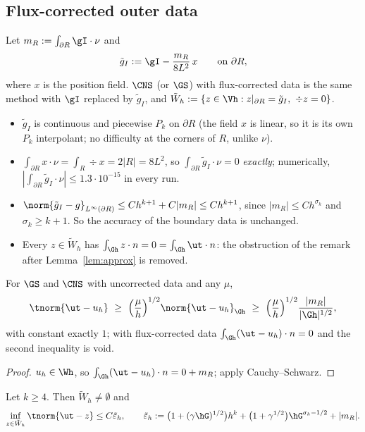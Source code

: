 \subsection{Flux-corrected outer data}\label{rs:sec:flux}

\begin{definition}\label{rs:def}
Let $m_R:=\int_{\partial R}\gI\cdot\nu$ and
\[
\tilde g_I:=\gI-\frac{m_R}{8L^2}\,x\qquad\text{on }\partial R,
\]
where $x$ is the position field. $\CNS$ (or $\GS$) with flux-corrected data is the same method with $\gI$ replaced by $\tilde g_I$, and $\tilde W_h:=\{z\in\Vh:z|_{\partial R}=\tilde g_I,\ \div z=0\}$.
\end{definition}

\begin{itemize}
\item $\tilde g_I$ is continuous and piecewise $P_k$ on $\partial R$ (the field $x$ is linear, so it is its own $P_k$ interpolant; no difficulty at the corners of $R$, unlike $\nu$).
\item $\int_{\partial R}x\cdot\nu=\int_R\div x=2|R|=8L^2$, so $\int_{\partial R}\tilde g_I\cdot\nu=0$ \emph{exactly}; numerically, $|\int_{\partial R}\tilde g_I\cdot\nu|\le1.3\cdot10^{-15}$ in every run.
\item $\norm{\tilde g_I-g}_{L^\infty(\partial R)}\le Ch^{k+1}+C|m_R|\le Ch^{k+1}$, since $|m_R|\le Ch^{\sigma_k}$ and $\sigma_k\ge k+1$. So the accuracy of the boundary data is unchanged.
\item Every $z\in\tilde W_h$ has $\int_{\Gh}z\cdot n=0=\int_{\Gh}\ut\cdot n$: the obstruction of the remark after Lemma~\ref{lem:approx} is removed.
\end{itemize}

\begin{proposition}\label{rs:floor}
For $\GS$ and $\CNS$ with uncorrected data and any $\mu$,
\[
\tnorm{\ut-u_h}\ \ge\ \Bigl(\frac\mu h\Bigr)^{1/2}\norm{\ut-u_h}_{\Gh}\ \ge\ \Bigl(\frac\mu h\Bigr)^{1/2}\frac{|m_R|}{|\Gh|^{1/2}},
\]
with constant exactly $1$; with flux-corrected data $\int_{\Gh}(\ut-u_h)\cdot n=0$ and the second inequality is void.
\end{proposition}

\begin{proof}
$u_h\in\Wh$, so $\int_{\Gh}(\ut-u_h)\cdot n=0+m_R$; apply Cauchy--Schwarz.
\end{proof}

\begin{lemma}\label{rs:approx}
Let $k\ge4$. Then $\tilde W_h\neq\emptyset$ and
\[
\inf_{z\in\tilde W_h}\tnorm{\ut-z}\le C\tilde\varepsilon_h,\qquad
\tilde\varepsilon_h:=\bigl(1+(\gamma\hG)^{1/2}\bigr)h^k+\bigl(1+\gamma^{1/2}\bigr)\hG^{\sigma_k-1/2}+|m_R| .
\]
\end{lemma}

